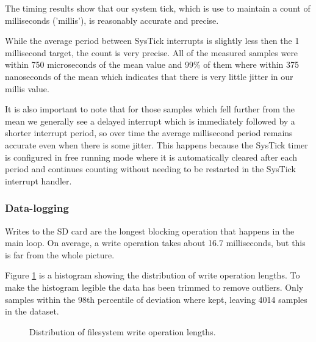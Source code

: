 The timing results show that our system tick, which is use to maintain a count
of milliseconds ('millis'), is reasonably accurate and precise.

While the average period between SysTick interrupts is slightly less then the 1
millisecond target, the count is very precise. All of the measured samples were
within 750 microseconds of the mean value and 99\% of them where within 375
nanoseconds of the mean which indicates that there is very little jitter in our
millis value.

It is also important to note that for those samples which fell further from the
mean we generally see a delayed interrupt which is immediately followed by a
shorter interrupt period, so over time the average millisecond period remains
accurate even when there is some jitter. This happens because the SysTick timer
is configured in free running mode where it is automatically cleared after each
period and continues counting without needing to be restarted in the SysTick
interrupt handler.

\subsubsection{Data-logging}
\label{subsec:testing-data-logging}

Writes to the SD card are the longest blocking operation that happens in the
main loop. On average, a write operation takes about 16.7 milliseconds, but this
is far from the whole picture.

Figure \ref{fig:write-op-hist} is a histogram showing the distribution of write
operation lengths. To make the histogram legible the data has been trimmed to
remove outliers. Only samples within the 98th percentile of deviation where
kept, leaving 4014 samples in the dataset.


\begin{figure}[!htb]
\centering


\caption{Distribution of filesystem write operation lengths.}
\label{fig:write-op-hist}
\end{figure}

